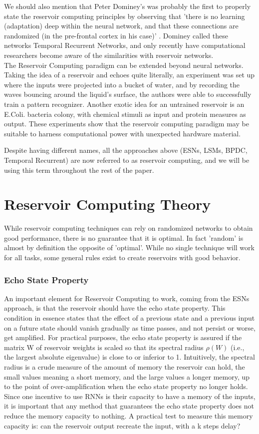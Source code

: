 \documentclass[12pt,oneside]{CUNY_CS_PhD}
\begin{document}
We should also mention that Peter Dominey's was probably the first to properly state the reservoir computing principles by observing that 'there is no learning (adaptation) deep within the neural network, and that these connections are randomized (in the pre-frontal cortex in his case)' \cite{DomineyRamus00}. Dominey called these networks Temporal Recurrent Networks, and only recently have computational researchers become aware of the similarities with reservoir networks.\\
The Reservoir Computing paradigm can be extended beyond neural networks. Taking the idea of a reservoir and echoes quite literally, an experiment was set up where the inputs were projected into a bucket of water, and by recording the waves bouncing around the liquid's surface, the authors were able to successfully train a pattern recognizer. Another exotic idea for an untrained reservoir is an E.Coli. bacteria colony, with chemical stimuli as input and protein measures as output. These experiments show that the reservoir computing paradigm may be suitable to harness computational power with unexpected hardware material.

Despite having different names, all the approaches above (ESNs, LSMs, BPDC, Temporal Recurrent) are now referred to as reservoir computing, and we will be using this term throughout the rest of the paper.

\section{Reservoir Computing Theory}
\label{theory} 
While reservoir computing techniques can rely on randomized networks to obtain good performance, there is no guarantee that it is optimal. In fact 'random' is almost by definition the opposite of 'optimal'. While no single technique will work for all tasks, some general rules exist to create reservoirs with good behavior.

\subsubsection{Echo State Property}
An important element for Reservoir Computing to work, coming from the ESNs approach, is that the reservoir should have the echo state property. This condition in essence states that the effect of a previous state and a previous input on a future state should vanish gradually as time passes, and not persist or worse, get amplified. For practical purposes, the echo state property is assured if the matrix W of reservoir weights is scaled so that its spectral radius $\rho(W)$ (i.e., the largest absolute eigenvalue) is close to or inferior to 1. Intuitively, the spectral radius is a crude measure of the amount of memory the reservoir can hold, the small values meaning a short memory, and the large values a longer memory, up to the point of over-amplification when the echo state property no longer holds. Since one incentive to use RNNs is their capacity to have a memory of the inputs, it is important that any method that guarantees the echo state property does not reduce the memory capacity to nothing. A practical test to measure this memory capacity is: can the reservoir output recreate the input, with a k steps delay? 
\end{document}
